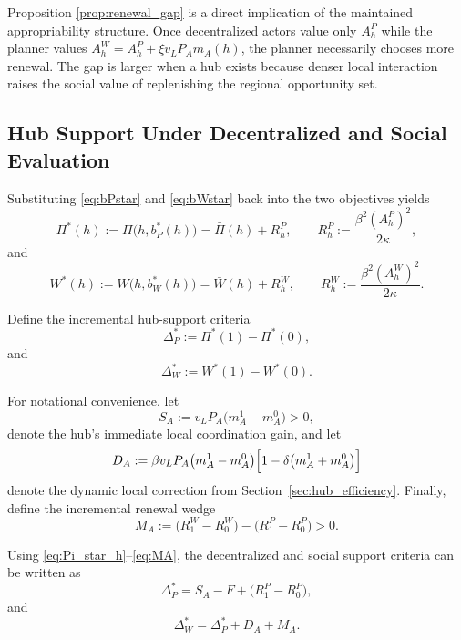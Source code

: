 Proposition \ref{prop:renewal_gap} is a direct implication of the maintained appropriability structure. Once decentralized actors value only $A_h^P$ while the planner values $A_h^W=A_h^P+\xi v_L P_A m_A(h)$, the planner necessarily chooses more renewal. The gap is larger when a hub exists because denser local interaction raises the social value of replenishing the regional opportunity set.

\subsection{Hub Support Under Decentralized and Social Evaluation}

Substituting \eqref{eq:bPstar} and \eqref{eq:bWstar} back into the two objectives yields
\begin{equation}
\Pi^*(h)
:=
\Pi\bigl(h,b_P^*(h)\bigr)
=
\bar\Pi(h)+R_h^P,
\qquad
R_h^P:=\frac{\beta^2(A_h^P)^2}{2\kappa},
\label{eq:Pi_star_h}
\end{equation}
and
\begin{equation}
W^*(h)
:=
W\bigl(h,b_W^*(h)\bigr)
=
\bar W(h)+R_h^W,
\qquad
R_h^W:=\frac{\beta^2(A_h^W)^2}{2\kappa}.
\label{eq:W_star_h}
\end{equation}

Define the incremental hub-support criteria
\begin{equation}
\Delta_P^*
:=
\Pi^*(1)-\Pi^*(0),
\label{eq:DeltaP_star}
\end{equation}
and
\begin{equation}
\Delta_W^*
:=
W^*(1)-W^*(0).
\label{eq:DeltaW_star}
\end{equation}

For notational convenience, let
\begin{equation}
S_A
:=
v_L P_A\bigl(m_A^1-m_A^0\bigr)>0,
\label{eq:SA}
\end{equation}
denote the hub's immediate local coordination gain, and let
\begin{equation}
D_A
:=
\beta v_L P_A\bigl(m_A^1-m_A^0\bigr)\Bigl[1-\delta\bigl(m_A^1+m_A^0\bigr)\Bigr]
\label{eq:DA}
\end{equation}
denote the dynamic local correction from Section~\ref{sec:hub_efficiency}. Finally, define the incremental renewal wedge
\begin{equation}
M_A
:=
\bigl(R_1^W-R_0^W\bigr)-\bigl(R_1^P-R_0^P\bigr)
>0.
\label{eq:MA}
\end{equation}

Using \eqref{eq:Pi_star_h}--\eqref{eq:MA}, the decentralized and social support criteria can be written as
\begin{equation}
\Delta_P^*
=
S_A-F+\bigl(R_1^P-R_0^P\bigr),
\label{eq:DeltaP_star_expanded}
\end{equation}
and
\begin{equation}
\Delta_W^*
=
\Delta_P^*+D_A+M_A.
\label{eq:DeltaW_star_wedge}
\end{equation}

